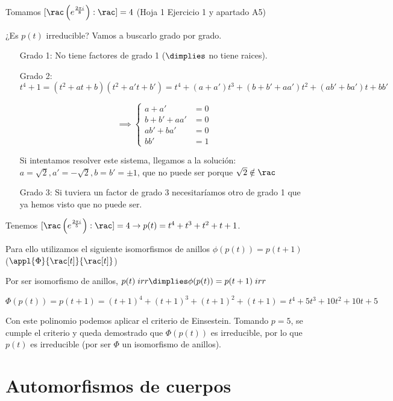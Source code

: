 \documentclass{apuntes}
\begin{document}
\begin{example}
Tomamos $[\rac\left(e^{\frac{2\pi i}{8}}\right):\rac] = 4$ (Hoja 1 Ejercicio 1 y apartado A5)

¿Es $p(t)$ irreducible? Vamos a buscarlo grado por grado.

\begin{itemize}
\item[Grado 1:] No tiene factores de grado 1 ($\dimplies$ no tiene raices).

\item[Grado 2:] $t^4+1 = (t^2 + at + b) (t^2+a't+b') = t^4 + (a+a')t^3+ (b+b'+aa') t^2 + (ab' + ba') t + bb'$

\[\implies \left\{\begin{array}{cc}
a+a' &=0\\b+b'+aa'&=0\\ab'+ba' &=0\\bb'&=1
\end{array}\right.\]

Si intentamos resolver este sistema, llegamos a la solución: $a=\sqrt{2},a'=-\sqrt{2},b=b'=\pm 1$, que no puede ser porque $\sqrt{2}\notin\rac$

\item[Grado 3:] Si tuviera un factor de grado 3 necesitaríamos otro de grado 1 que ya hemos visto que no puede ser.
\end{itemize}
\end{example}

\begin{example}[2]
\label{Teoria_H1.E1.A5.S_Af}
Tenemos $[\rac\left(e^{\frac{2\pi i}{5}}\right) : \rac]=4 \to p(t) = t^4 + t^3 + t^2 + t + 1$.

Para ello utilizamos el siguiente isomorfismos de anillos $\phi(p(t))=p(t+1)$\\ ($\appl{\Phi}{\rac[t]}{\rac[t]}$)

Por ser isomorfismo de anillos, $p(t) \;irr \dimplies \phi(p(t)) = p(t+1)\; irr$

\[\Phi(p(t)) = p(t+1) = (t+1)^4 + (t+1)^3 + (t+1)^2 + (t+1) = t^4 + 5t^3 + 10t^2 + 10t + 5\]

Con este polinomio podemos aplicar el criterio de Einsestein. Tomando $p=5$, se cumple el criterio y queda demostrado que $\Phi(p(t))$ es irreducible, por lo que $p(t)$ es irreducible (por ser $\Phi$ un isomorfismo de anillos).

\end{example}

\chapter{Automorfismos de cuerpos}
\end{document}
